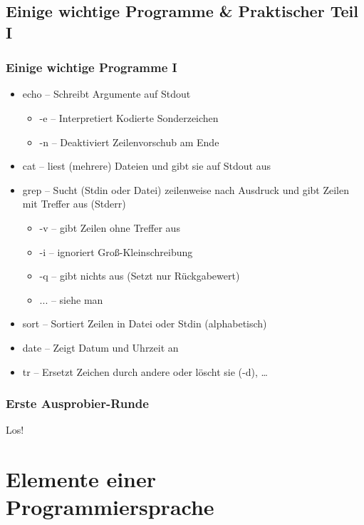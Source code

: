 \documentclass{beamer}
\begin{document}
\subsection{Einige wichtige Programme \& Praktischer Teil I}
\begin{frame}[<+->]
 \frametitle{Einige wichtige Programme I}
 \begin{itemize}
   \item echo -- Schreibt Argumente auf Stdout
     \begin{itemize}
       \item -e -- Interpretiert Kodierte Sonderzeichen
       \item -n -- Deaktiviert Zeilenvorschub am Ende
     \end{itemize}
   \item cat -- liest (mehrere) Dateien und gibt sie auf Stdout aus
   \item grep -- Sucht (Stdin oder Datei) zeilenweise nach Ausdruck und gibt Zeilen mit Treffer aus (Stderr)
     \begin{itemize}
       \item -v -- gibt Zeilen ohne Treffer aus
       \item -i -- ignoriert Groß-Kleinschreibung
       \item -q -- gibt nichts aus (Setzt nur Rückgabewert)
       \item ... -- siehe man
     \end{itemize}
   \item sort -- Sortiert Zeilen in Datei oder Stdin (alphabetisch)
   \item date -- Zeigt Datum und Uhrzeit an
   \item tr -- Ersetzt Zeichen durch andere oder löscht sie (-d), …
 \end{itemize}
\end{frame}

\begin{frame}
 \frametitle{Erste Ausprobier-Runde}
 \begin{center}
 Los!
 \end{center}
\end{frame}

\section{Elemente einer Programmiersprache}
\end{document}
